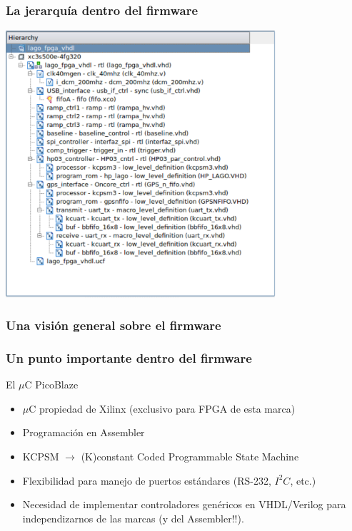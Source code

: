 \documentclass{beamer}
\begin{document}
\begin{frame}
  \frametitle{La jerarquía dentro del firmware}
  \begin{block}{}
    \centering
    \includegraphics[height=0.75\textheight,width=0.75\textwidth]{d5/jerarquia_lago}
  \end{block}
\end{frame}

\subsubsection{Una visión general sobre el firmware}

\begin{frame}
  \frametitle{Un punto importante dentro del firmware}
    \begin{block}{El $\mu$C PicoBlaze}
      \begin{itemize}[<+->]
        \item  $\mu$C propiedad de Xilinx (exclusivo para FPGA de esta marca)
        \item  Programación en Assembler
        \item  KCPSM $\rightarrow$ (K)constant Coded Programmable State
               Machine
        \item  Flexibilidad para manejo de puertos estándares (RS-232, $I^2C$,
               etc.)
        \item  Necesidad de implementar controladores genéricos en
               VHDL/Verilog para independizarnos de las marcas (y del
							 Assembler!!).
      \end{itemize}
    \end{block}
\end{frame}
\end{document}
